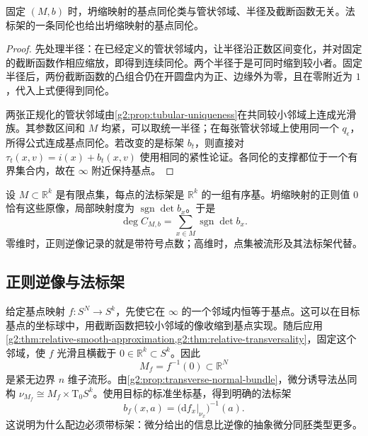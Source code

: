 \begin{proposition}\label{g2:prop:collapse-choice-independence}
	固定 \((M,b)\) 时，坍缩映射的基点同伦类与管状邻域、半径及截断函数无关。法标架的一条同伦也给出坍缩映射的基点同伦。
\end{proposition}
\begin{proof}
	先处理半径：在已经定义的管状邻域内，让半径沿正数区间变化，并对固定的截断函数作相应缩放，即得到连续同伦。两个半径于是可同时缩到较小者。固定半径后，两份截断函数的凸组合仍在开圆盘内为正、边缘外为零，且在零附近为 \(1\)，代入上式便得到同伦。

	两张正规化的管状邻域由\cref{g2:prop:tubular-uniqueness}在共同较小邻域上连成光滑族。其参数区间和 \(M\) 均紧，可以取统一半径；在每张管状邻域上使用同一个 \(q_\epsilon\)，所得公式连成基点同伦。若改变的是标架 \(b_t\)，则直接对 \(\tau_t(x,v)=i(x)+b_t(x,v)\) 使用相同的紧性论证。各同伦的支撑都位于一个有界集合内，故在 \(\infty\) 附近保持基点。
\end{proof}

\begin{example}\label{g2:exm:pt-zero-dimensional-degree}
	设 \(M\subset\mathbb R^k\) 是有限点集，每点的法标架是 \(\mathbb R^k\) 的一组有序基。坍缩映射的正则值 \(0\) 恰有这些原像，局部映射度为 \(\operatorname{sgn}\det b_x\)。于是
	\[
		\deg C_{M,b}=\sum_{x\in M}\operatorname{sgn}\det b_x.
	\]
	零维时，正则逆像记录的就是带符号点数；高维时，点集被流形及其法标架代替。
\end{example}

\subsection{正则逆像与法标架}
\label{g2:subsec:2302:03}
给定基点映射 \(f:S^N\to S^k\)，先使它在 \(\infty\) 的一个邻域内恒等于基点。这可以在目标基点的坐标球中，用截断函数把较小邻域的像收缩到基点实现。随后应用\cref{g2:thm:relative-smooth-approximation,g2:thm:relative-transversality}，固定这个邻域，使 \(f\) 光滑且横截于 \(0\in\mathbb R^k\subset S^k\)。因此
\[
	M_f=f^{-1}(0)\subset\mathbb R^N
\]
是紧无边界 \(n\) 维子流形。由\cref{g2:prop:transverse-normal-bundle}，微分诱导法丛同构 \(\nu_{M_f}\cong M_f\times\mathrm T_0S^k\)。使用目标的标准坐标基，得到明确的法标架
\begin{equation}\label{g2:eq:regular-fiber-framing}
	b_f(x,a)=\bigl(\mathrm df_x|_{\nu_x}\bigr)^{-1}(a).
\end{equation}
这说明为什么配边必须带标架：微分给出的信息比逆像的抽象微分同胚类型更多。

